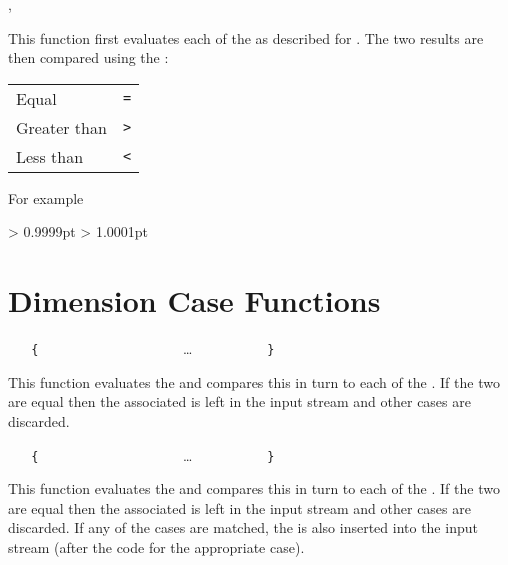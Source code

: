 \documentclass[oneside]{book}
\begin{document}
\begin{function}{\DimCompare,\DimCompareTF}
\begin{syntax}
   
     
\end{syntax}
This function first evaluates each of the 
as described for . The two results are then
compared using the :\par
{\centering
\begin{tabular}{ll}
Equal        & \verb|=| \\
Greater than & \verb|>| \\
Less than    & \verb|<| \\
\end{tabular}\par}
For example
\begin{demohigh}
\DimCompareTF {1pt} > {0.9999pt} {} {}
\DimCompareTF {1pt} > {1.0001pt} {} {}
\end{demohigh}
\end{function}

\section{Dimension Case Functions}

\begin{function}{\DimCase}
\begin{syntax}
 
~ ~ \verb|{|
~ ~ ~ ~  
~ ~ ~ ~   
~ ~ ~ ~ \ldots
~ ~ ~ ~  
~ ~ \verb|}|
\end{syntax}
This function evaluates the  and
compares this in turn to each of the
. If the two are equal then the
associated  is left in the input stream
and other cases are discarded.
\end{function}

\begin{function}{\DimCaseT}
\begin{syntax}
 
~ ~ \verb|{|
~ ~ ~ ~  
~ ~ ~ ~   
~ ~ ~ ~ \ldots
~ ~ ~ ~  
~ ~ \verb|}|
~ ~ 
\end{syntax}
This function evaluates the  and
compares this in turn to each of the
. If the two are equal then the
associated  is left in the input stream
and other cases are discarded. If any of the
cases are matched, the  is also inserted into the
input stream (after the code for the appropriate case).
\end{function}
\end{document}
